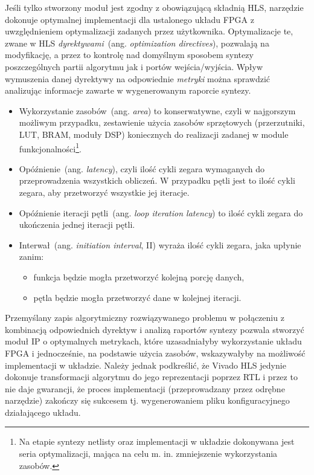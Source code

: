 Jeśli tylko stworzony moduł jest zgodny z obowiązującą składnią HLS, narzędzie dokonuje optymalnej implementacji dla ustalonego układu FPGA z uwzględnieniem optymalizacji zadanych przez użytkownika. Optymalizacje te, zwane w HLS \textit{dyrektywami}~(ang. \textit{optimization directives}), pozwalają na modyfikację, a przez to kontrolę nad domyślnym sposobem syntezy poszczególnych partii algorytmu jak i portów wejścia/wyjścia. Wpływ wymuszenia danej dyrektywy na odpowiednie \textit{metryki} można sprawdzić analizując informacje zawarte w wygenerowanym raporcie syntezy.
\begin{itemize}
\item Wykorzystanie zasobów~(ang. \textit{area}) to konserwatywne, czyli w najgorszym możliwym przypadku, zestawienie użycia zasobów sprzętowych (przerzutniki, LUT, BRAM, moduły DSP) koniecznych do realizacji zadanej w module funkcjonalności\footnote{Na etapie syntezy netlisty oraz implementacji w układzie dokonywana jest seria optymalizacji, mająca na celu m. in. zmniejszenie wykorzystania zasobów.}. 
\item Opóźnienie~(ang. \textit{latency}), czyli ilość cykli zegara wymaganych do przeprowadzenia wszystkich obliczeń. W przypadku pętli jest to ilość cykli zegara, aby przetworzyć wszystkie jej iteracje.
\item Opóźnienie iteracji pętli~(ang. \textit{loop iteration latency}) to ilość cykli zegara do ukończenia jednej iteracji pętli.
\item Interwał~(ang. \textit{initiation interval}, II) wyraża ilość cykli zegara, jaka upłynie zanim:
\begin{itemize}
\item funkcja będzie mogła przetworzyć kolejną porcję danych,
\item pętla będzie mogła przetworzyć dane w kolejnej iteracji.
\end{itemize} 
\end{itemize}
Przemyślany zapis algorytmiczny rozwiązywanego problemu w połączeniu z kombinacją odpowiednich dyrektyw i analizą raportów syntezy pozwala stworzyć moduł IP o optymalnych metrykach, które uzasadniałyby wykorzystanie układu FPGA i jednocześnie, na podstawie użycia zasobów, wskazywałyby na możliwość implementacji w układzie. Należy jednak podkreślić, że Vivado HLS jedynie dokonuje transformacji algorytmu do jego reprezentacji poprzez RTL i przez to nie daje gwarancji, że proces implementacji (przeprowadzany przez odrębne narzędzie) zakończy się sukcesem tj. wygenerowaniem pliku konfiguracyjnego działającego układu.

